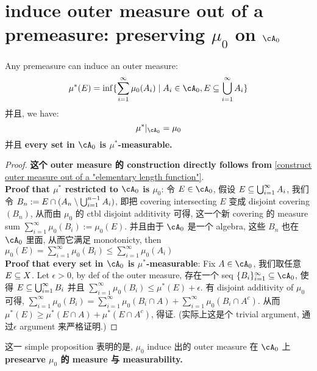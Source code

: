 \documentclass[lang=cn,11pt]{elegantbook}
\begin{document}
\section{induce outer measure out of a premeasure: preserving $\mu_0$ on $\cA_0$}
\begin{proposition}
\label{construct outer measure out of a premeasure}
    Any premeasure can induce an outer measure:
    \begin{equation}
        \mu^*(E) = \inf \{  \sum_{i=1}^\infty \mu_0(A_i) \mid A_i \in \cA_0, E \sub \union_{i=1}^\infty A_i   \}
    \end{equation}
    并且, we have:
    \begin{equation}
        \mu^*|_{\cA_0} = \mu_0
    \end{equation}
    并且 \textbf{every set in $\cA_0$ is $\mu^*$-measurable.}
\end{proposition}
\begin{proof}
    \textbf{这个 outer measure 的 construction directly follows from} \ref{construct outer measure out of a "elementary length function"}.\\
    \noindent \textbf{Proof that $\mu^*$ restricted to $\cA_0$ is $\mu_0$}: 令 $E \in \cA_0$, 假设 $E \subseteq \bigcup_{i=1}^\infty A_i$, 我们令 $B_n := E \cap (A_n \setminus \bigcup_{i=1}^{n-1} A_i)$, 即把 covering intersecting $E$ 变成 disjoint covering $(B_n)$, 从而由 $\mu_0$ 的 ctbl disjoint additivity 可得, 这一个新 covering 的 measure sum $\sum_{i=1}^\infty \mu_0(B_i) := \mu_0(E)$. 并且由于 $\cA_0$ 是一个 algebra, 这些 $B_n$ 也在 $\cA_0$ 里面, 从而它满足 monotonicty, then $\mu_0(E) = \sum_{i=1}^\infty \mu_0(B_i) \leq \sum_{i=1}^\infty \mu_0(A_i) $\\
    \noindent \textbf{Proof that every set in $\cA_0$ is $\mu^*$-measurable}: Fix $A \in \cA_0$, 我们取任意 $E \subseteq X$.
    Let $\epsilon > 0$, by def of the outer measure, 存在一个 seq $\{ B_i\}_{i=1}^\infty \sub \cA_0$, 使得 $E \subseteq \bigcup_{i=1}^\infty B_i$ 并且 $\sum_{i=1}^\infty \mu_0(B_i) \leq \mu^*(E) + \epsilon$. 有 disjoint additivity of $\mu_0$ 可得, $\sum_{i=1}^\infty \mu_0(B_i) = \sum_{i=1}^\infty \mu_0(B_i\cap A) + \sum_{i=1}^\infty \mu_0(B_i\cap A^c)$. 从而 $\mu^*(E) \geq \mu^*(E \cap A) + \mu^*(E\cap A^c)$, 得证. (实际上这是个 trivial argument, 通过$\epsilon$ argument 来严格证明.)
\end{proof}
\begin{remark}
    这一 simple proposition 表明的是, $\mu_0$ induce 出的 outer measure 在 $\cA_0$ 上 \textbf{presearve $\mu_0$ 的 measure 与 measurability.}
\end{remark}
\end{document}
